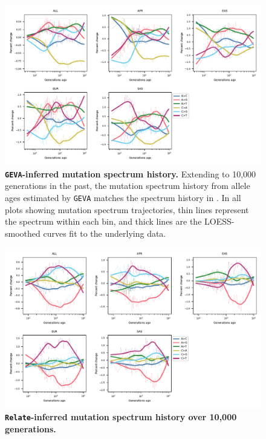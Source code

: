 \documentclass[]{article}
\newcommand{\GEVA}{\texttt{GEVA}\xspace}
\newcommand{\relate}{\texttt{Relate}\xspace}
\begin{document}
\begin{figure}[ht!]
    \centering
    \includegraphics[width=\textwidth]{../plots/spectrum_history.geva.max_age.10000.pdf}
    \caption{
        \textbf{\GEVA-inferred mutation spectrum history.}
        Extending to 10,000 generations in the past, the mutation spectrum history
        from allele ages estimated by \GEVA matches the spectrum history in
        \citet{wang2023human}.
        In all plots showing mutation spectrum trajectories, thin lines represent
        the spectrum within each bin, and thick lines are the LOESS-smoothed
        curves fit to the underlying data.
    }
    \label{fig:geva-spectra}
\end{figure}


\begin{figure}[ht!]
    \centering
    \includegraphics[width=\textwidth]{../plots/spectrum_history.relate.max_age.10000.pdf}
    \caption{
        \textbf{\relate-inferred mutation spectrum history over 10,000 generations.}
    }
    \label{fig:relate-spectra}
\end{figure}
\end{document}
